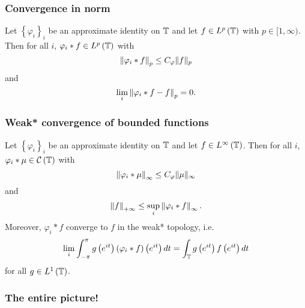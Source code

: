 \subsubsection{Convergence in norm}
\begin{theorem}
    Let $\left\{ \varphi _{i} \right\}_{i}$ be an approximate identity on $\mathbb T$ and let $f \in L^{p} \left( \mathbb T \right)$ with $p \in [1, \infty)$. Then for all $i$, $\varphi_{i} * f  \in L^{p} \left( \mathbb T \right)$ with
    \begin{equation*}
	\left\lVert \varphi _{i} * f \right\rVert_{p} \le C_{\varphi} \lVert f \rVert _{p}
    \end{equation*}
    and
    \begin{equation*}
	\lim_{i} \left\lVert \varphi_{i} * f -f \right\rVert_{p} = 0 \text{.}
	    \end{equation*} 
    \label{thm:convergence-in-Lp}
\end{theorem}


\subsubsection{Weak* convergence of bounded functions}
\begin{theorem}
    Let $\left\{ \varphi _{i} \right\}_{i}$ be an approximate identity on $\mathbb T$ and let $f\in L^{\infty} \left( \mathbb T \right)$. Then for all $i$, $\varphi_{i} * \mu  \in {\cal C} \left( \mathbb T \right)$ with
    \begin{equation*}
	\left\lVert \varphi _{i} * \mu \right\rVert_{\infty} \le C_{\varphi} \lVert \mu \rVert _{\infty}
    \end{equation*}
    and
    \begin{equation*}
	\left\lVert f \right\rVert_{+\infty} \le \sup_{i} \left\lVert \varphi_{i} * f \right\rVert_{\infty}\text{.}
    \end{equation*}
    Moreover, $\varphi_{i} * f$ converge to $f$ in the weak* topology, i.e.
    \begin{equation*}
    \lim_{i} \int_{-\pi}^{\pi} g\left( e^{it} \right) \left( \varphi_{i} * f \right) \left( e^{it} \right) dt = \int_{\mathbb T} g\left( e^{it} \right) f \left( e^{it} \right) dt 
    \end{equation*}
    for all $g \in L^{1} \left( \mathbb T \right)$.
    \label{thm:weak-star-infinity}
\end{theorem}

\subsubsection{The entire picture!}


